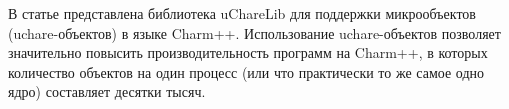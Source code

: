 \documentclass[11pt, oneside, a4paper]{article}
\begin{document}
%
%
%
%

В статье представлена библиотека uChareLib для поддержки микрообъектов (uchare-объектов) в языке Charm++. Использование uchare-объектов
позволяет значительно повысить производительность программ на Charm++, в которых количество объектов на один процесс (или что практически 
то же самое одно ядро) составляет десятки тысяч. 	
 
\end{document}
